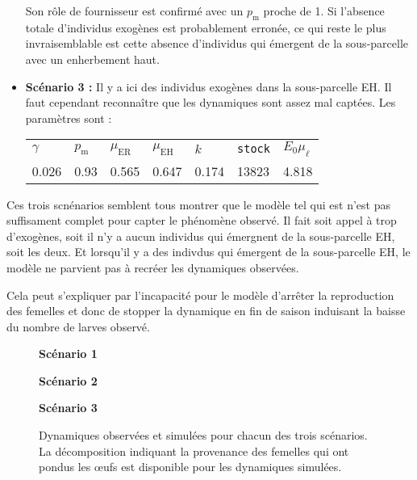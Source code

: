 \begin{itemize}
Son rôle de fournisseur est confirmé avec un $p_{\text{m}}$ proche de 1.
Si l'absence totale d'individus exogènes est probablement erronée, ce qui reste le plus invraisemblable est cette absence d'individus qui émergent de la sous-parcelle avec un enherbement haut.
\item \textbf{Scénario 3 :} Il y a ici des individus exogènes dans la sous-parcelle EH.
Il faut cependant reconnaître que les dynamiques sont assez mal captées.
Les paramètres sont :
 \begin{center}
\begin{tabular}{lllllll}
$\gamma$ & $p_{\text{m}}$ & $\mu_{\text{ER}}$ & $\mu_{\text{EH}}$ & $k$ & \texttt{stock} & $E_0\mu_{\ell}$\\
0.026 & 0.93 & 0.565 & 0.647 & 0.174 & 13823 & 4.818
 \end{tabular}
 \end{center}
\end{itemize}

Ces trois scnénarios semblent tous montrer que le modèle tel qui est n'est pas suffisament complet pour capter le phénomène observé.
Il fait soit appel à trop d'exogènes, soit il n'y a aucun individus qui émergnent de la sous-parcelle EH, soit les deux.
Et lorsqu'il y a des indivdus qui émergent de la sous-parcelle EH, le modèle ne parvient pas à recréer les dynamiques observées.

Cela peut s'expliquer par l'incapacité pour le modèle d'arrêter la reproduction des femelles et donc de stopper la dynamique en fin de saison induisant la baisse du nombre de larves observé.


\begin{figure}
 \centering
 \textbf{Scénario 1}
 
 
 \textbf{Scénario 2}
 
 
 \textbf{Scénario 3}
 
 \caption{Dynamiques observées et simulées pour chacun des trois scénarios. La décomposition indiquant la provenance des femelles qui ont pondus les œufs est disponible pour les dynamiques simulées.}
 \label{fig:A1}
\end{figure}










